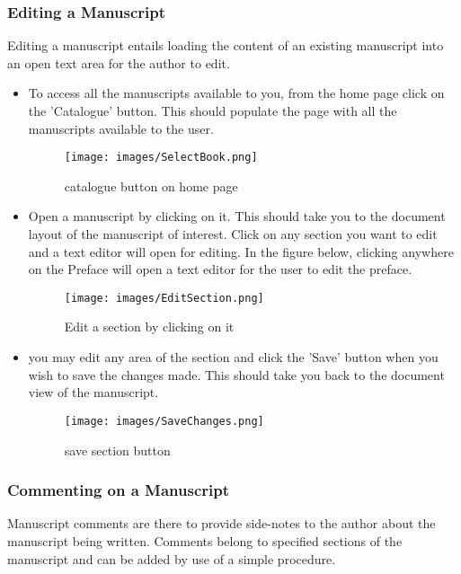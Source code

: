 \subsubsection{Editing a Manuscript}
	Editing a manuscript entails loading the content of an existing manuscript into an open text area for the author to edit. 

	\begin{itemize}
		\item To access all the manuscripts available to you, from the home page click on the 'Catalogue' button. This should populate the page with all the manuscripts available to the user. 
		\begin{figure}[h]
			\centering
			\texttt{[image: images/SelectBook.png]}
			\caption{catalogue button on home page}
		\end{figure} 
		
		\newpage
		\item Open a manuscript by clicking on it. This should take you to the document layout of the manuscript of interest. Click on any section you want to edit and a text editor will open for editing. In the figure below, clicking anywhere on the Preface will open a text editor for the user to edit the preface.
		\begin{figure}[h]
			\centering
			\texttt{[image: images/EditSection.png]}
			\caption{Edit a section by clicking on it}
		\end{figure} 
		\item you may edit any area of the section and click the 'Save' button when you wish to save the changes made. This should take you back to the document view of the manuscript.
		
		\begin{figure}[h]
			\centering
			\texttt{[image: images/SaveChanges.png]}
			\caption{save section button}
		\end{figure} 
	\end{itemize}
	
\subsubsection{Commenting on a Manuscript}
Manuscript comments are there to provide side-notes to the author about the manuscript being written. Comments belong to specified sections of the manuscript and can be added by use of a simple procedure.


